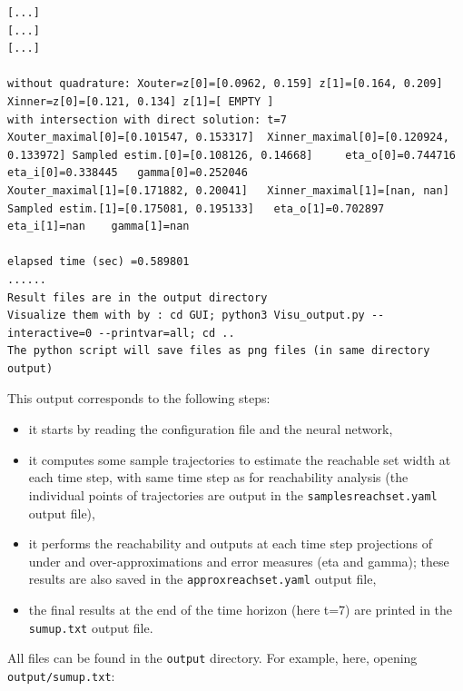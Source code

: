 \documentclass{article}
\begin{document}
\begin{verbatim}
[...]
[...]
[...]

without quadrature: Xouter=z[0]=[0.0962, 0.159] z[1]=[0.164, 0.209] 
Xinner=z[0]=[0.121, 0.134] z[1]=[ EMPTY ] 
with intersection with direct solution: t=7
Xouter_maximal[0]=[0.101547, 0.153317] 	Xinner_maximal[0]=[0.120924, 0.133972] Sampled estim.[0]=[0.108126, 0.14668] 	 eta_o[0]=0.744716	 eta_i[0]=0.338445	 gamma[0]=0.252046
Xouter_maximal[1]=[0.171882, 0.20041] 	Xinner_maximal[1]=[nan, nan] 	Sampled estim.[1]=[0.175081, 0.195133] 	 eta_o[1]=0.702897	 eta_i[1]=nan	 gamma[1]=nan

elapsed time (sec) =0.589801
......
Result files are in the output directory
Visualize them with by : cd GUI; python3 Visu_output.py --interactive=0 --printvar=all; cd ..
The python script will save files as png files (in same directory output)
 \end{verbatim}
 \normalsize
This output corresponds to the following steps:
\begin{itemize}[noitemsep]
\item it starts by reading the configuration file and the neural network,
\item it  computes some sample trajectories to estimate the reachable set width at each time step, with same time step as for reachability analysis (the individual points of trajectories are output in the \texttt{samplesreachset.yaml} output file),
\item it performs the reachability and outputs at each time step projections of under and over-approximations and error measures (eta and gamma); these results are also saved in the \texttt{approxreachset.yaml} output file,
\item the final results at the end of the time horizon (here t=7) are printed in the \texttt{sumup.txt} output file.
\end{itemize}
All files can be found in the \texttt{output} directory.  For example, here, opening  \texttt{output/sumup.txt}:
\small
\end{document}
